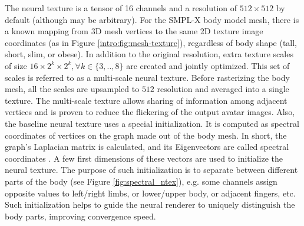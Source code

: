 
The neural texture is a tensor of 16 channels and a resolution of $512\times512$ by default (although may be arbitrary). For the SMPL-X body model mesh, there is a known mapping from 3D mesh vertices to the same 2D texture image coordinates (as in Figure \ref{intro:fig:mesh-texture}), regardless of body shape (tall, short, slim, or obese). In addition to the original resolution, extra texture scales of size $16\times 2^k \times 2^k, \forall k \in \{3,..,8\}$ are created and jointly optimized. This set of scales is referred to as a multi-scale neural texture. Before rasterizing the body mesh, all the scales are upsampled to $512$ resolution and averaged into a single texture. The multi-scale texture allows sharing of information among adjacent vertices and is proven to reduce the flickering of the output avatar images. Also, the baseline neural texture uses a special initialization. It is computed as spectral coordinates of vertices on the graph made out of the body mesh. In short, the graph's Laplacian matrix is calculated, and its Eigenvectors are called spectral coordinates \cite{aux:spectral10}. A few first dimensions of these vectors are used to initialize the neural texture. The purpose of such initialization is to separate between different parts of the body (see Figure \ref{fig:spectral_ntex}), e.g. some channels assign opposite values to left/right limbs, or lower/upper body, or adjacent fingers, etc. Such initialization helps to guide the neural renderer to uniquely distinguish the body parts, improving convergence speed.

